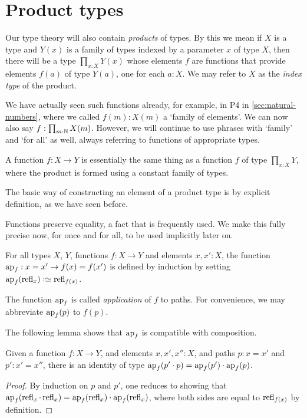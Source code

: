 \section{Product types}
\label{sec:product-types}
Our type theory will also contain \emph{products} of types. 
By this we mean if $X$ is a type and $Y(x)$ is a family of types indexed by a
parameter $x$ of type $X$, then there will be a type $\prod_{x:X} Y(x)$ 
whose elements $f$ are functions that provide elements $f(a)$ of type
$Y(a)$, one for each $a:X$. We may refer to $X$ as the 
\emph{index type} of the product.

We have actually seen such functions already, for example,
in P4 in \cref{sec:natural-numbers}, where
we called $f(m):X(m)$ a `family of elements'. We can now
also say $f: \prod_{m:\mathbb{N}} X(m)$. However, we will continue to use
phrases with `family' and `for all' as well, always referring to functions
of appropriate types.

A function $f : X \to Y$ is essentially the same thing as a function $f$ 
of type $\prod_{x:X} Y$, where the product is formed using a constant family of types.

The basic way of constructing an element of a product type
is by explicit definition, as we have seen before.

Functions preserve equality, a fact that is frequently used.
We make this fully precise now, for once and for all, 
to be used implicitly later on.

\begin{definition}\label{def:ap}
For all types $X$, $Y$, functions $f:X\to Y$ and elements $x,x':X$, the function
$\ap{f} : x = x' \to f(x) = f(x')$ is defined by induction by setting 
$\ap{f}(\refl{x})\defeq\refl{f(x)}$.
\end{definition}

The function $\ap f$ is called {\em application} of $f$ to paths.  For convenience, we may abbreviate $\ap f (p)$ to $f(p)$.

The following lemma shows that $\ap f$ is compatible with composition.

\begin{lemma}\label{lem:apcomp}
  Given a function $f:X\to Y$, and elements $x,x',x'':X$, and paths $p : x = x'$ and $p' : x' = x''$,
  there is an identity of type $\ap f (p' \cdot p) =  \ap f (p') \cdot  \ap f (p)$.
\end{lemma}

\begin{proof}
  By induction on $p$ and $p'$, one reduces to showing that $\ap f (\refl x \cdot \refl x) =  \ap f ( \refl x ) \cdot  \ap f ( \refl x )$, where
  both sides are equal to $\refl { f(x) }$ by definition.
\end{proof}

